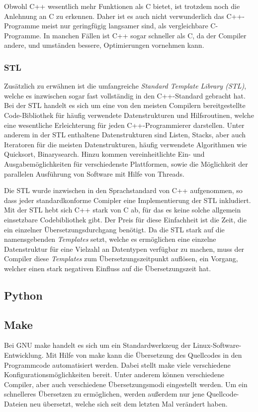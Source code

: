 Obwohl C++ wesentlich mehr Funktionen als C bietet, ist trotzdem noch die Anlehnung an C zu erkennen. Daher ist es auch nicht verwunderlich das C++-Programme meist nur geringfügig langsamer sind, als 
vergleichbare C-Programme. In manchen Fällen ist C++ sogar schneller als C, da der Compiler andere, und umständen bessere, Optimierungen vornehmen kann. 

\subsubsection{STL}
\label{sec:stl}
Zusätzlich zu erwähnen ist die umfangreiche \textit{Standard Template Library (STL)}, welche es inzwischen sogar fast vollständig in den 
C++-Standard gebracht hat. Bei der STL handelt es sich um eine von den meisten Compilern bereitgestellte Code-Bibliothek für häufig 
verwendete Datenstrukturen und Hilfsroutinen, welche eine wesentliche Erleichterung für jeden C++-Programmierer darstellen. Unter anderem
in der STL enthaltene Datenstrukturen sind Listen, Stacks, aber auch Iteratoren für die meisten Datenstrukturen, häufig verwendete Algorithmen
wie Quicksort, Binarysearch. Hinzu kommen vereinheitlichte Ein- und Ausgabemöglichkeiten für verschiedenste Plattformen, sowie die 
Möglichkeit der parallelen Ausführung von Software mit Hilfe von Threads.

Die STL wurde inzwischen in den Sprachstandard von C++ aufgenommen, so dass jeder standardkonforme Comipler eine Implementierung der STL inkludiert. Mit der STL hebt sich C++ stark von C ab, für 
das es keine solche allgemein einsetzbare Codebibliothek gibt. Der Preis für diese Einfachheit ist die Zeit, die ein einzelner Übersetzungsdurchgang benötigt. Da die STL stark auf die namensgebenden
\textit{Templates} setzt, welche es ermöglichen eine einzelne Datenstruktur für eine Vielzahl an Datentypen verfügbar zu machen, muss der Compiler diese \textit{Templates} zum Übersetzungszeitpunkt
auflösen, ein Vorgang, welcher einen stark negativen Einfluss auf die Übersetzungszeit hat.

\subsection{Python}

\subsection{Make}
\label{sec:make}
Bei GNU make handelt es sich um ein Standardwerkzeug der Linux-Software-Entwicklung. Mit Hilfe von make kann die Übersetzung des Quellcodes in den Programmcode automatisiert werden. 
Dabei stellt make viele verschiedene Konfigurationsmöglichkeiten bereit. Unter anderem können verschiedene Compiler, aber auch verschiedene Übersetzungsmodi eingestellt werden.
Um ein schnelleres Übersetzen zu ermöglichen, werden außerdem nur jene Quellcode-Dateien neu übersetzt, welche sich seit dem letzten Mal verändert haben. 

